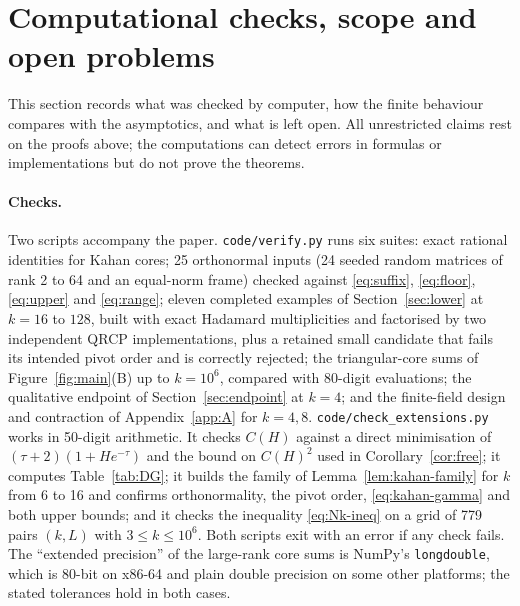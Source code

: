 \documentclass[11pt,a4paper]{article}
\theoremstyle{definition}
\numberwithin{equation}{section}
\begin{document}
\section{Computational checks, scope and open problems}\label{sec:scope}

This section records what was checked by computer, how the finite behaviour compares with the asymptotics, and
what is left open. All unrestricted claims rest on the proofs above; the computations can detect errors in formulas
or implementations but do not prove the theorems.

\paragraph{Checks.} Two scripts accompany the paper. \texttt{code/verify.py} runs six suites: exact rational
identities for Kahan cores; 25 orthonormal inputs (24 seeded random matrices of rank 2 to 64 and an equal-norm frame)
checked against \eqref{eq:suffix}, \eqref{eq:floor}, \eqref{eq:upper} and \eqref{eq:range}; eleven completed
examples of Section~\ref{sec:lower} at $k=16$ to $128$, built with exact Hadamard multiplicities and factorised by
two independent QRCP implementations, plus a retained small candidate that fails its intended pivot order and is
correctly rejected; the triangular-core sums of Figure~\ref{fig:main}(B) up to $k=10^6$, compared with 80-digit
evaluations; the qualitative endpoint of Section~\ref{sec:endpoint} at $k=4$; and the finite-field design and
contraction of Appendix~\ref{app:A} for $k=4,8$. \texttt{code/check\_extensions.py} works in 50-digit arithmetic. It
checks $C(H)$ against a direct minimisation of $(\tau+2)(1+He^{-\tau})$ and the bound on $C(H)^2$ used in
Corollary~\ref{cor:free}; it computes Table~\ref{tab:DG}; it builds the family of Lemma~\ref{lem:kahan-family} for
$k$ from 6 to 16 and confirms orthonormality, the pivot order, \eqref{eq:kahan-gamma} and both upper bounds; and it
checks the inequality \eqref{eq:Nk-ineq} on a grid of 779 pairs $(k,L)$ with $3\le k\le10^6$. Both scripts exit with
an error if any check fails. The ``extended precision'' of the large-rank core sums is NumPy's \texttt{longdouble},
which is 80-bit on x86-64 and plain double precision on some other platforms; the stated tolerances hold in both
cases.
\end{document}
